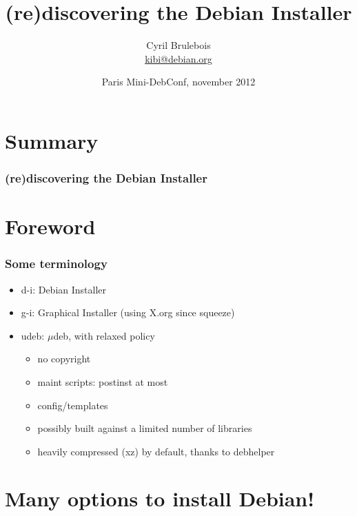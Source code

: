 \documentclass[handout]{beamer}
\title{(re)discovering the Debian Installer}
\author[Cyril]{
  Cyril Brulebois\\
  \small{\url{kibi@debian.org}}
}
\date{Paris Mini-DebConf, november 2012}
\begin{document}
\begin{frame}[fragile]
  \titlepage
\end{frame}

\section*{Summary}

\begin{frame}[fragile]
  \frametitle{(re)discovering the Debian Installer}

  \tableofcontents
\end{frame}


\section{Foreword}

\begin{frame}[fragile]
  \frametitle{Some terminology}

  \begin{itemize}
  \item d-i: Debian Installer
  \item g-i: Graphical Installer (using X.org since squeeze)
  \end{itemize}

  \vspace{1em}
  \pause

  \begin{itemize}
  \item udeb: $\mu$deb, with relaxed policy
    \pause
    \begin{itemize}
    \item no copyright
    \item maint scripts: postinst at most
    \item config/templates
    \item possibly built against  a limited number of libraries
    \item heavily compressed (xz) by default, thanks to debhelper
    \end{itemize}
  \end{itemize}
\end{frame}


\section{Many options to install Debian!}
\end{document}
